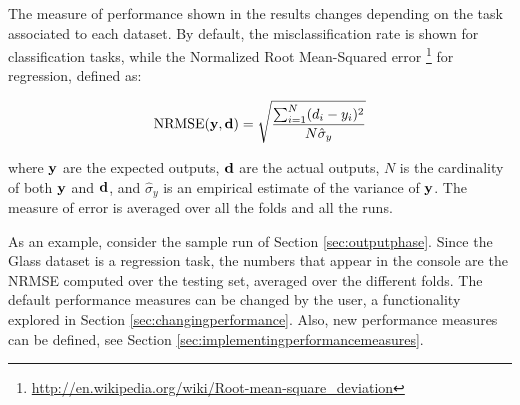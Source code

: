 The measure of performance shown in the results changes depending on the task associated to each dataset. By default, the misclassification rate is shown for classification tasks, while the Normalized Root Mean-Squared error \footnote{\url{http://en.wikipedia.org/wiki/Root-mean-square_deviation}} for regression, defined as:

\begin{equation}
\text{NRMSE}(\mathbf{y}, \mathbf{d}) = \sqrt{\frac{\sum_{i=1}^N (d_i-y_i)^2}{N \hat{\sigma}_y}}
\label{eq:nrmse}
\end{equation}

\noindent where $\mathbf{y}$ are the expected outputs, $\mathbf{d}$ are the actual outputs, $N$ is the cardinality of both $\mathbf{y}$ and $\mathbf{d}$, and $ \hat{\sigma}_y$ is an empirical estimate of the variance of $\mathbf{y}$. The measure of error is averaged over all the folds and all the runs.

As an example, consider the sample run of Section \ref{sec:outputphase}. Since the Glass dataset is a regression task, the numbers that appear in the console are the NRMSE computed over the testing set, averaged over the different folds. The default performance measures can be changed by the user, a functionality explored in Section \ref{sec:changingperformance}. Also, new performance measures can be defined, see Section \ref{sec:implementingperformancemeasures}. 
